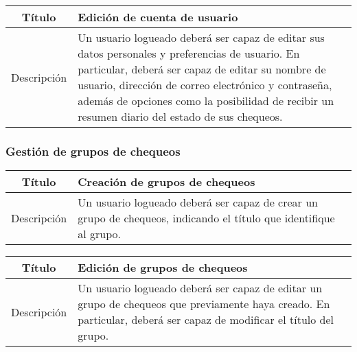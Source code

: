 \begin{center}
  
  \begin{tabularx}{\textwidth}{|c|X|}
    \hline
    Título & Edición de cuenta de usuario \\

    \hline

    Descripción & Un usuario logueado deberá ser capaz de editar sus datos
    personales y preferencias de usuario. En particular, deberá ser capaz de
    editar su nombre de usuario, dirección de correo electrónico y contraseña,
    además de opciones como la posibilidad de recibir un resumen diario del
    estado de sus chequeos.\\

    \hline
  \end{tabularx}
\end{center}

\FloatBarrier
\subsubsection{Gestión de grupos de chequeos}

\begin{center}
  
  \begin{tabularx}{\textwidth}{|c|X|}
    \hline
    Título & Creación de grupos de chequeos \\

    \hline

    Descripción & Un usuario logueado deberá ser capaz de crear un grupo de
    chequeos, indicando el título que identifique al grupo.\\

    \hline
  \end{tabularx}
\end{center}

\begin{center}
  
  \begin{tabularx}{\textwidth}{|c|X|}
    \hline
    Título & Edición de grupos de chequeos \\

    \hline

    Descripción & Un usuario logueado deberá ser capaz de editar un grupo de
    chequeos que previamente haya creado. En particular, deberá ser capaz de
    modificar el título del grupo.

    \\

    \hline
  \end{tabularx}
\end{center}

